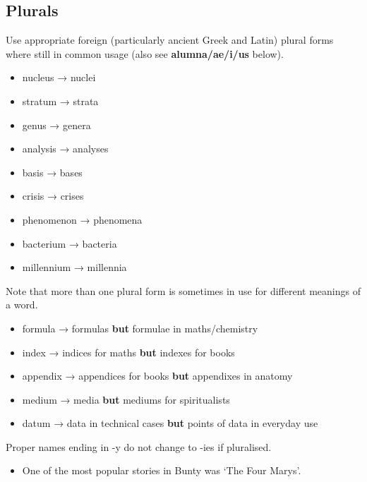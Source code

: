 \documentclass[11pt,a4paper]{book}
\newcommand{\cmark}{{\color{green(html/cssgreen)}\checkmark}}%
\newcommand{\warningmark}{{\color{cadmiumorange}}\textbf{!}}%
\begin{document}
			\subsection{Plurals}
				Use appropriate foreign (particularly ancient Greek and Latin) plural forms where still in common usage (also see \textbf{alumna/ae/i/us} below).
				{\firasans \begin{mdframed}[backgroundcolor=aliceblue] \begin{itemize}[label=\cmark]
					\item nucleus → nuclei
					\item stratum → strata
					\item genus → genera
					\item analysis → analyses
					\item basis → bases
					\item crisis → crises
					\item phenomenon → phenomena
					\item bacterium → bacteria
					\item millennium → millennia
				\end{itemize} \end{mdframed} }
				Note that more than one plural form is sometimes in use for different meanings of a word.
				{\firasans \begin{mdframed}[backgroundcolor=aliceblue] \begin{itemize}[label=\warningmark]
					\item formula → formulas \textbf{but} formulae in maths/chemistry
					\item index → indices for maths \textbf{but} indexes for books
					\item appendix → appendices for books \textbf{but} appendixes in anatomy
					\item medium → media \textbf{but} mediums for spiritualists
					\item datum → data in technical cases \textbf{but} points of data in everyday use
				\end{itemize} \end{mdframed} }
				Proper names ending in -y do not change to -ies if pluralised.
				{\firasans \begin{mdframed}[backgroundcolor=aliceblue] \begin{itemize}[label=\cmark]
					\item One of the most popular stories in Bunty was `The Four Marys'.
				\end{itemize} \end{mdframed} }
\end{document}
